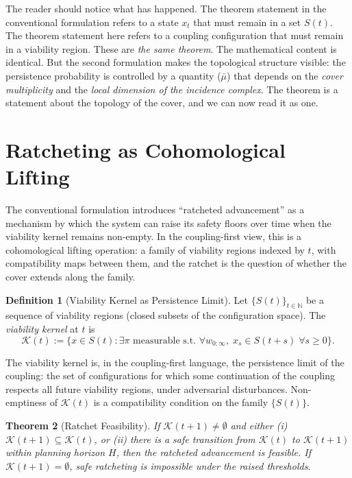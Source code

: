 \documentclass[11pt]{article}
\newtheorem{theorem}{Theorem}[section]
\theoremstyle{definition}
\newtheorem{definition}[theorem]{Definition}
\theoremstyle{remark}
\begin{document}
The reader should notice what has happened. The theorem statement in the conventional formulation refers to a state $x_t$ that must remain in a set $S(t)$. The theorem statement here refers to a coupling configuration that must remain in a viability region. These are \emph{the same theorem}. The mathematical content is identical. But the second formulation makes the topological structure visible: the persistence probability is controlled by a quantity ($\bar\mu$) that depends on the \emph{cover multiplicity} and the \emph{local dimension of the incidence complex}. The theorem is a statement about the topology of the cover, and we can now read it as one.

\section{Ratcheting as Cohomological Lifting}

The conventional formulation introduces ``ratcheted advancement'' as a mechanism by which the system can raise its safety floors over time when the viability kernel remains non-empty. In the coupling-first view, this is a cohomological lifting operation: a family of viability regions indexed by $t$, with compatibility maps between them, and the ratchet is the question of whether the cover extends along the family.

\begin{definition}[Viability Kernel as Persistence Limit]
Let $\{S(t)\}_{t \in \mathbb{N}}$ be a sequence of viability regions (closed subsets of the configuration space). The \emph{viability kernel} at $t$ is
\begin{equation}
\mathcal{K}(t) := \{x \in S(t) : \exists \pi \text{ measurable s.t.\ } \forall w_{0:\infty}, \; x_s \in S(t+s) \; \forall s \geq 0\}.
\end{equation}
\end{definition}

The viability kernel is, in the coupling-first language, the persistence limit of the coupling: the set of configurations for which some continuation of the coupling respects all future viability regions, under adversarial disturbances. Non-emptiness of $\mathcal{K}(t)$ is a compatibility condition on the family $\{S(t)\}$.

\begin{theorem}[Ratchet Feasibility]
\label{thm:ratchet}
If $\mathcal{K}(t+1) \neq \emptyset$ and either (i) $\mathcal{K}(t+1) \subseteq \mathcal{K}(t)$, or (ii) there is a safe transition from $\mathcal{K}(t)$ to $\mathcal{K}(t+1)$ within planning horizon $H$, then the ratcheted advancement is feasible. If $\mathcal{K}(t+1) = \emptyset$, safe ratcheting is impossible under the raised thresholds.
\end{theorem}
\end{document}
